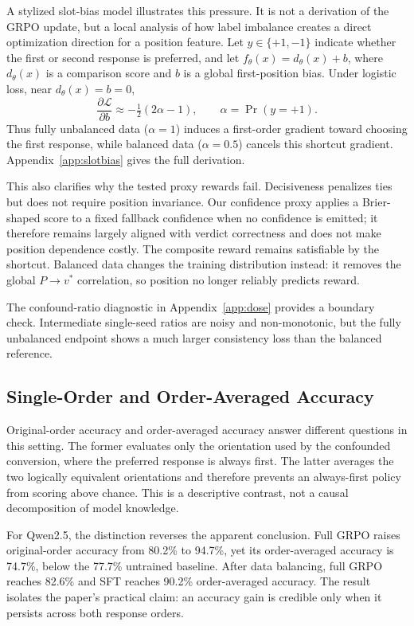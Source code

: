 \documentclass[11pt]{article}
\begin{document}
A stylized slot-bias model illustrates this pressure. It is not a derivation of the GRPO update, but a local analysis of how label imbalance creates a direct optimization direction for a position feature. Let $y \in \{+1,-1\}$ indicate whether the first or second response is preferred, and let $f_\theta(x)=d_\theta(x)+b$, where $d_\theta(x)$ is a comparison score and $b$ is a global first-position bias. Under logistic loss, near $d_\theta(x)=b=0$,
\[
\frac{\partial \mathcal{L}}{\partial b}
\approx -\tfrac{1}{2}(2\alpha-1),
\qquad \alpha=\Pr(y=+1).
\]
Thus fully unbalanced data ($\alpha=1$) induces a first-order gradient toward choosing the first response, while balanced data ($\alpha=0.5$) cancels this shortcut gradient. Appendix~\ref{app:slotbias} gives the full derivation.

This also clarifies why the tested proxy rewards fail. Decisiveness penalizes ties but does not require position invariance. Our confidence proxy applies a Brier-shaped score to a fixed fallback confidence when no confidence is emitted; it therefore remains largely aligned with verdict correctness and does not make position dependence costly. The composite reward remains satisfiable by the shortcut. Balanced data changes the training distribution instead: it removes the global $P \to v^*$ correlation, so position no longer reliably predicts reward.

The confound-ratio diagnostic in Appendix~\ref{app:dose} provides a boundary check. Intermediate single-seed ratios are noisy and non-monotonic, but the fully unbalanced endpoint shows a much larger consistency loss than the balanced reference.

\subsection{Single-Order and Order-Averaged Accuracy}

Original-order accuracy and order-averaged accuracy answer different questions in this setting. The former evaluates only the orientation used by the confounded conversion, where the preferred response is always first. The latter averages the two logically equivalent orientations and therefore prevents an always-first policy from scoring above chance. This is a descriptive contrast, not a causal decomposition of model knowledge.

For Qwen2.5, the distinction reverses the apparent conclusion. Full GRPO raises original-order accuracy from 80.2\% to 94.7\%, yet its order-averaged accuracy is 74.7\%, below the 77.7\% untrained baseline. After data balancing, full GRPO reaches 82.6\% and SFT reaches 90.2\% order-averaged accuracy. The result isolates the paper's practical claim: an accuracy gain is credible only when it persists across both response orders.
\end{document}
